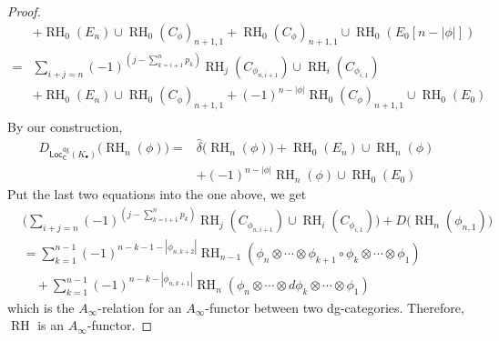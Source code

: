 \documentclass[12pt]{amsart}
\theoremstyle{definition}
\theoremstyle{remark}
\numberwithin{equation}{section}
\newcommand{\CC}{{\mathsf C}}
\newcommand{\1}{{\mathbb{1}}}
\newcommand{\Loc}{\mathsf{Loc}}
\newcommand{\RH}{\operatorname{RH}}
\newcommand{\bt}{\bullet}
\newcommand{\dg}{{\operatorname{dg}}}
\begin{document}
\begin{proof}
\begin{align*}
        &+ \RH_0(E_n)\cup\RH_0(C_{\phi})_{n+1, 1} + \RH_0(C_{\phi})_{n+1, 1}\cup \RH_0(E_0[n-|\phi|])\\
        =&\sum_{i+j = n}(-1)^{(j - \sum_{k = i+1}^n p_k)}\RH_j(C_{\phi_{n, i+1}})\cup \RH_i(C_{\phi_{i, 1}})\\
        &+ \RH_0(E_n)\cup\RH_0(C_{\phi})_{n+1, 1} + (-1)^{n-|\phi|}\RH_0(C_{\phi})_{n+1, 1}\cup \RH_0(E_0)\\
    \end{align*}
    By our construction,
    \begin{align*}
        D_{\Loc^{\dg}_{\CC}(K_{\bt})}\big(\RH_n(\phi)\big) =& \hat{\delta} \big(\RH_n(\phi)\big) + \RH_0(E_n)\cup \RH_n(\phi) \\
        &+(-1)^{n-|\phi|}\RH_n(\phi)\cup \RH_0(E_0)
    \end{align*}
    Put the last two equations into the one above, we get
    \begin{align*}
        & \Big(\sum_{i+j = n}(-1)^{(j - \sum_{k = i+1}^n p_k)}\RH_j(C_{\phi_{n, i+1}})\cup \RH_i(C_{\phi_{i, 1}})  \Big) + D\big(\RH_n(\phi_{n,1})\big)\\
       &=\sum_{k=1}^{n-1}(-1)^{n - k - 1 - |\phi_{n,k+2}|}\RH_{n-1}(\phi_n\otimes \cdots\otimes \phi_{k+1}\circ \phi_k\otimes \cdots \otimes \phi_1)\\
        & \quad + \sum_{k=1}^{n-1}(-1)^{n - k - |\phi_{n,k+1}|}\RH_{n}(\phi_n\otimes \cdots\otimes  d\phi_k\otimes \cdots \otimes \phi_1)
    \end{align*}
    which is the $A_{\infty}$-relation for an $A_{\infty}$-functor between two dg-categories. Therefore, $\RH$ is an $A_{\infty}$-functor.
    \end{proof}
\end{document}
